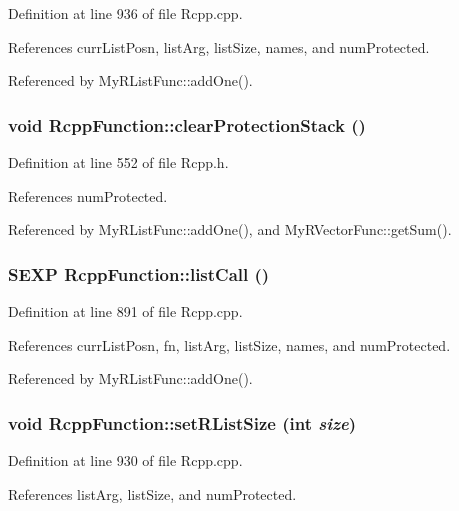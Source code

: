 Definition at line 936 of file Rcpp.cpp.

References currListPosn, listArg, listSize, names, and numProtected.

Referenced by MyRListFunc::addOne().\hypertarget{classRcppFunction_a689c914636f0f0e86b90da4425c6e6a3}{
\subsubsection[{clearProtectionStack}]{\setlength{\rightskip}{0pt plus 5cm}void RcppFunction::clearProtectionStack ()}}
\label{classRcppFunction_a689c914636f0f0e86b90da4425c6e6a3}


Definition at line 552 of file Rcpp.h.

References numProtected.

Referenced by MyRListFunc::addOne(), and MyRVectorFunc::getSum().\hypertarget{classRcppFunction_a0cc9d29ab7db552494dddefaa78e6578}{
\subsubsection[{listCall}]{\setlength{\rightskip}{0pt plus 5cm}SEXP RcppFunction::listCall ()}}
\label{classRcppFunction_a0cc9d29ab7db552494dddefaa78e6578}


Definition at line 891 of file Rcpp.cpp.

References currListPosn, fn, listArg, listSize, names, and numProtected.

Referenced by MyRListFunc::addOne().\hypertarget{classRcppFunction_af3dbcf8dcfbdfc49ef566b5efd0ad978}{
\subsubsection[{setRListSize}]{\setlength{\rightskip}{0pt plus 5cm}void RcppFunction::setRListSize (int {\em size})}}
\label{classRcppFunction_af3dbcf8dcfbdfc49ef566b5efd0ad978}


Definition at line 930 of file Rcpp.cpp.

References listArg, listSize, and numProtected.

